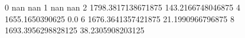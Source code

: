 0 nan nan
1 nan nan
2 1798.3817138671875 143.2166748046875
4 1655.1650390625 0.0
6 1676.3641357421875 21.1990966796875
8 1693.3956298828125 38.2305908203125
